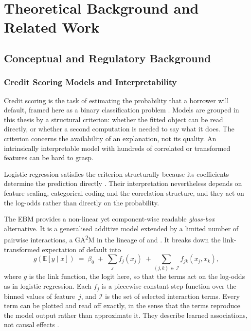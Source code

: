 \chapter{Theoretical Background and Related Work}\label{ch:background}

\section{Conceptual and Regulatory Background}

\subsection{Credit Scoring Models and Interpretability}

Credit scoring is the task of estimating the probability that a borrower will
default, framed here as a binary classification problem \citep{lessmannBenchmarkingStateoftheartClassification2015}. Models
are grouped in this thesis by a structural criterion: whether the fitted object can
be read directly, or whether a second computation is needed to say what it does. The
criterion concerns the availability of an explanation, not its quality. An
intrinsically interpretable model with hundreds of correlated or transformed features
can be hard to grasp.

Logistic regression satisfies the criterion structurally because its coefficients
determine the prediction directly
\citep{liptonMythosModelInterpretability2018}. Their interpretation nevertheless
depends on feature scaling, categorical coding and the correlation structure, and
they act on the log-odds rather than directly on the probability.

The EBM provides a non-linear yet component-wise readable \emph{glass-box}
alternative. It is a generalised additive model extended by a limited number of
pairwise interactions, a GA\textsuperscript{2}M in the lineage of
\citet{louAccurateIntelligibleModels2013} and
\citet{noriInterpretMLUnifiedFramework2019}. It breaks down the link-transformed
expectation of default into
\begin{equation}
g\!\left(\mathbb{E}[y \mid x]\right) \;=\; \beta_0 \;+\; \sum_{j} f_j(x_j)
\;+\!\! \sum_{(j,k)\,\in\,\mathcal{I}} \!\! f_{jk}(x_j, x_k),
\label{eq:ebm}
\end{equation}
where $g$ is the link function, the logit here, so that the terms act on the log-odds
as in logistic regression. Each $f_j$ is a piecewise constant step function over the
binned values of feature~$j$, and $\mathcal{I}$ is the set of selected
interaction terms. Every term can
be plotted and read off exactly, in the sense that the terms reproduce the model
output rather than approximate it. They describe learned associations, not causal
effects \citep{amekoeExploringAccuracyInterpretability2024b}.

